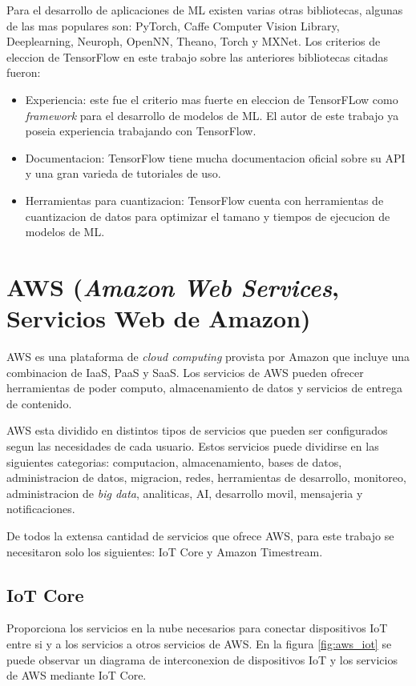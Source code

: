 Para el desarrollo de aplicaciones de ML existen varias otras bibliotecas, algunas de las mas populares son: PyTorch, Caffe Computer Vision Library, Deeplearning, Neuroph, OpenNN, Theano, Torch y MXNet. Los criterios de eleccion de TensorFlow en este trabajo sobre las anteriores bibliotecas citadas fueron:
\begin{itemize}
	\item Experiencia: este fue el criterio mas fuerte en eleccion de TensorFLow como \textit{framework} para el desarrollo de modelos de ML. El autor de este trabajo ya poseia experiencia trabajando con TensorFlow.
	\item Documentacion: TensorFlow tiene mucha documentacion oficial sobre su API y una gran varieda de tutoriales de uso.
	\item Herramientas para cuantizacion: TensorFlow cuenta con herramientas de cuantizacion de datos para optimizar el tamano y tiempos de ejecucion de modelos de ML.
\end{itemize}

\section{AWS (\textit{Amazon Web Services}, Servicios Web de Amazon)}
AWS es una plataforma de \textit{cloud computing} provista por Amazon que incluye una combinacion de IaaS, PaaS y SaaS. Los servicios de AWS pueden ofrecer herramientas de poder computo, almacenamiento de datos y servicios de entrega de contenido.

AWS esta dividido en distintos tipos de servicios que pueden ser configurados segun las necesidades de cada usuario. Estos servicios puede dividirse en las siguientes categorias: computacion, almacenamiento, bases de datos, administracion de datos, migracion, redes, herramientas de desarrollo, monitoreo, administracion de \textit{big data}, analiticas, AI, desarrollo movil, mensajeria y notificaciones.

De todos la extensa cantidad de servicios que ofrece AWS, para este trabajo se necesitaron solo los siguientes: IoT Core y Amazon Timestream.

\subsection{IoT Core}
Proporciona los servicios en la nube necesarios para conectar dispositivos IoT entre si y a los servicios a otros servicios de AWS. En la figura \ref{fig:aws_iot} se puede observar un diagrama de interconexion de dispositivos IoT y los servicios de AWS mediante IoT Core. 

